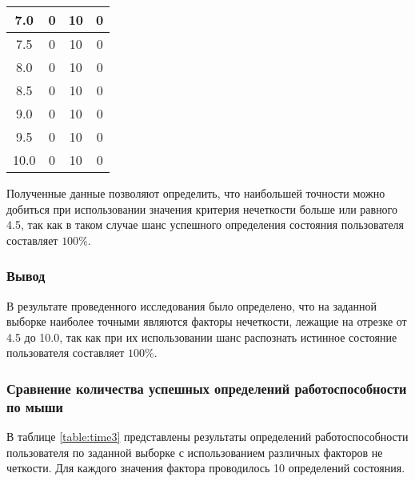 \begin{table}[H]
\begin{center}
\begin{tabular}{|c|ccc|}
			7.0& \multicolumn{1}{c|}{0}            & \multicolumn{1}{c|}{10}      &0 \\ \hline
			7.5& \multicolumn{1}{c|}{0}            & \multicolumn{1}{c|}{10}      &0 \\ \hline
			8.0& \multicolumn{1}{c|}{0}            & \multicolumn{1}{c|}{10}      &0 \\ \hline
			8.5& \multicolumn{1}{c|}{0}            & \multicolumn{1}{c|}{10}      &0 \\ \hline
			9.0& \multicolumn{1}{c|}{0}            & \multicolumn{1}{c|}{10}      &0 \\ \hline
			9.5& \multicolumn{1}{c|}{0}            & \multicolumn{1}{c|}{10}      &0 \\ \hline
			10.0& \multicolumn{1}{c|}{0}            & \multicolumn{1}{c|}{10}     &0 \\ \hline
		\end{tabular}
	\end{center}
\end{table}

Полученные данные позволяют определить, что наибольшей точности \newline можно добиться при использовании значения критерия нечеткости больше или равного 4.5, так как в таком случае шанс успешного определения состояния пользователя составляет $100\%$.

\subsubsection*{Вывод}

В результате проведенного исследования было определено, что на заданной выборке наиболее точными являются факторы нечеткости, лежащие на отрезке от 4.5 до 10.0, так как при их использовании шанс распознать истинное состояние пользователя составляет $100\%$.

\subsubsection[Сравнение количества успешных определений работоспособности по \newline мыши]{Сравнение количества успешных определений работоспособности по мыши}

В таблице \ref{table:time3} представлены результаты определений работоспособности пользователя по заданной выборке с использованием различных факторов не \- четкости. Для каждого значения фактора проводилось 10 определений состояния.

